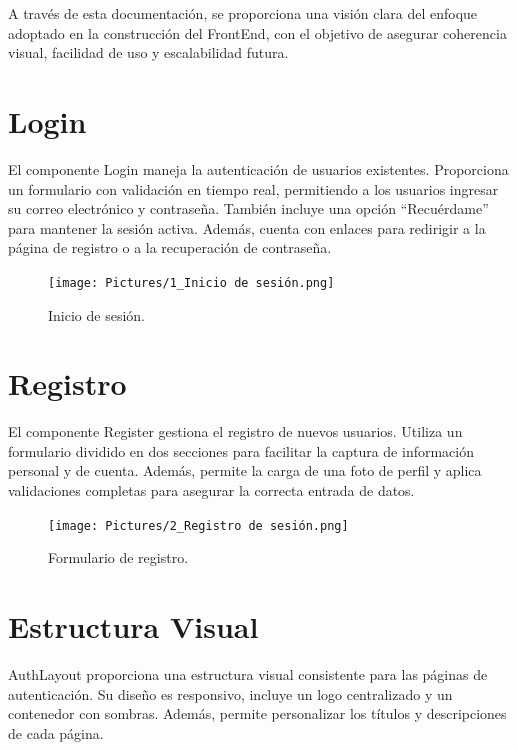 \documentclass[11pt, a4paper, oneside]{book}
\begin{document}
A través de esta documentación, se proporciona una visión clara del enfoque adoptado en la construcción del FrontEnd, con el objetivo de asegurar coherencia visual, facilidad de uso y escalabilidad futura.


    \section{Login}
    El componente Login maneja la autenticación de usuarios existentes. Proporciona un formulario con validación en tiempo real, permitiendo a los usuarios ingresar su correo electrónico y contraseña. También incluye una opción \textquotedblleft{}Recuérdame\textquotedblright{} para mantener la sesión activa. Además, cuenta con enlaces para redirigir a la página de registro o a la recuperación de contraseña.

\begin{figure}[H]
    \centering
\texttt{[image: Pictures/1\_Inicio de sesión.png]}
    \caption{\label{fig:frog}Inicio de sesión.}

\end{figure}
    
    \section{Registro}
    El componente Register gestiona el registro de nuevos usuarios. Utiliza un formulario dividido en dos secciones para facilitar la captura de información personal y de cuenta. Además, permite la carga de una foto de perfil y aplica validaciones completas para asegurar la correcta entrada de datos.
    
    \begin{figure}[H]
    \centering
    \texttt{[image: Pictures/2\_Registro de sesión.png]}
    \caption{\label{fig:frog}Formulario de registro.}
    \end{figure}

    \vspace{3cm}

        
    \section{Estructura Visual}
    AuthLayout proporciona una estructura visual consistente para las páginas de autenticación. Su diseño es responsivo, incluye un logo centralizado y un contenedor con sombras. Además, permite personalizar los títulos y descripciones de cada página.
    
\end{document}
